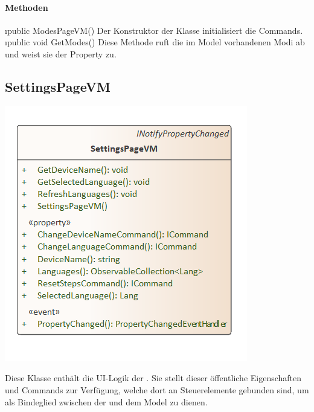 \documentclass[../entwurf.tex]{subfiles}
\begin{document}
\paragraph{Methoden}
\begin{itemize}
	\i{public ModesPageVM()} Der Konstruktor der Klasse initialisiert die Commands.
	\i{public void GetModes()} Diese Methode ruft die im Model vorhandenen Modi ab und weist sie der Property  zu.
\end{itemize}
\subsection{SettingsPageVM}
\begin{minipage}{0.5\textwidth}
\includegraphics[scale=0.75]{../graphics/vm_klassen/SettingsPageVM.png}
\end{minipage}
\begin{minipage}{0.5\textwidth}
Diese Klasse enthält die UI-Logik der . Sie stellt dieser öffentliche Eigenschaften und Commands zur Verfügung, welche dort an Steuerelemente gebunden sind, um als Bindeglied zwischen der  und dem Model zu dienen.
\end{minipage}
\end{document}
